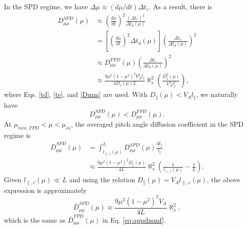 \documentclass[preprint2,twocolumn,times,tighten]{aastex63}
\begin{document}
{In the SPD regime, 
we have $\Delta \mu\approx (d\mu/dt) \Delta t_e$. 
As a result, there is 
\begin{equation}
\begin{aligned}
    D_{\mu\mu}^{SPD}(\mu)
    &\approx \left( \frac{d\mu}{dt}\right)^2 \frac{(\Delta t_e)^2}{\Delta t_d(\mu)} \\
    &= \left[\left(\frac{d\mu}{dt}\right)^2 \Delta t_d(\mu)\right] \left(\frac{\Delta t_e}{\Delta t_d(\mu)}\right)^2 \\
    & \approx D_{\mu\mu}^{FPD}(\mu) \left(\frac{\Delta t_e}{\Delta t_d(\mu)}\right)^2 \\
    & \approx 
     \frac{9 \mu^2(1-\mu^2)^2 V_A^2 l_\|}{4 D_\|(\mu)L}  \aleph_s^2 \left(\frac{D_{\|}^2(\mu)}{V_A^2 l_\|^2}\right),
\end{aligned}
\end{equation}
where Eqs. \eqref{td}, \eqref{te}, and \eqref{Dmm} are used. 
With $D_\|(\mu) < V_A l_\|$, we naturally have 
\begin{equation}
   D_{\mu\mu}^{SPD}(\mu) < D_{\mu\mu}^{FPD}(\mu).
\end{equation}
At $\mu_{min,FPD}<\mu<\mu_{ca}$, the averaged pitch angle diffusion coefficient in the SPD regime is 
\begin{equation}
\begin{aligned}
  \bar{D}_{\mu\mu}^{SPD}(\mu)
  &= \int_{l_{\|,c}(\mu)}^L D_{\mu\mu}^{SPD}(\mu) \frac{dl_\|}{l_\|} \\
  &\approx \frac{9\mu^2(1-\mu^2)^2D_\|(\mu)}{4L}\aleph_s^2\left(\frac{1}{l_{\|,c}(\mu)}-\frac{1}{L}\right).
\end{aligned}
\end{equation}
Given $l_{\|,c}(\mu)\ll L$ and using the relation $D_{\|}(\mu) = V_A l_{\|,c}(\mu)$, the above expression is approximately
\begin{equation}\label{eq:apdmmsbm}
\bar{D}_{\mu\mu}^{SPD}(\mu) \approx
\frac{9\mu^2(1-\mu^2)^2 V_A}{4L}\aleph_s^2,
\end{equation}
which is the same as 
$\bar{D}_{\mu\mu}^{FPD}(\mu)$ in Eq. \eqref{eq:appdmmf}.

}
\end{document}
